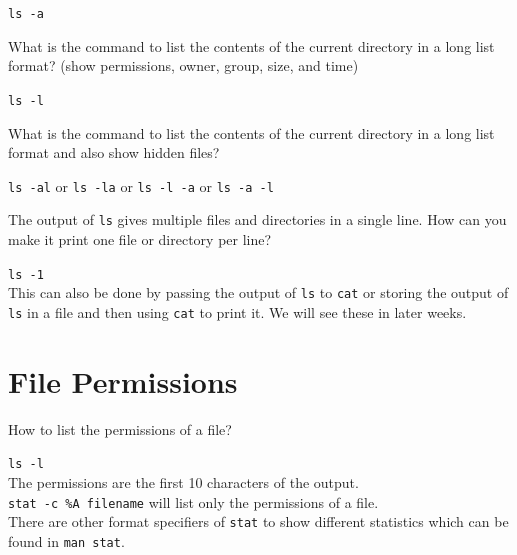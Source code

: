 \begin{ans}
\texttt{ls -a}
\end{ans}

\begin{qs}
  What is the command to list the contents of the current directory
  in a long list format? (show permissions, owner, group, size, and time)
\end{qs}

\begin{ans}
\texttt{ls -l}
\end{ans}

\begin{qs}
  What is the command to list the contents of the current directory
  in a long list format and also show hidden files?
\end{qs}

\begin{ans}
\texttt{ls -al} or \texttt{ls -la} or \texttt{ls -l -a} or \texttt{ls -a -l}
\end{ans}

\begin{qs}
  The output of \texttt{ls} gives multiple files and directories in a single
  line. How can you make it print one file or directory per line?
\end{qs}

\begin{ans}
  \texttt{ls -1}\\
  This can also be done by passing the output of \texttt{ls} to \texttt{cat}
  or storing the output of \texttt{ls} in a file and then using \texttt{cat}
  to print it. We will see these in later weeks.
\end{ans}

\section{File Permissions}
\begin{qs}
  How to list the permissions of a file?
\end{qs}

\begin{ans}
  \texttt{ls -l} \\
  The permissions are the first 10 characters of the output.\\
  \texttt{stat -c \%A filename} will list only the permissions of a file.\\
  There are other format specifiers of \texttt{stat} to show different statistics
  which can be found in \texttt{man stat}.
\end{ans}

